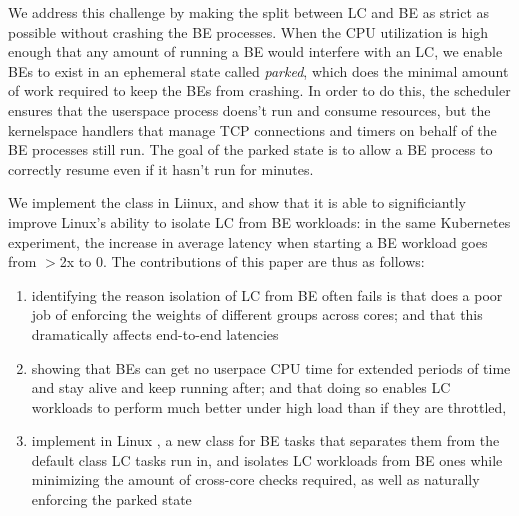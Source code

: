 We address this challenge by making the split between LC and BE as strict as
possible without crashing the BE processes. When the CPU utilization is high
enough that any amount of running a BE would interfere with an LC, we enable BEs
to exist in an ephemeral state called \textit{parked}, which does the minimal
amount of work required to keep the BEs from crashing. In order to do this, the
scheduler ensures that the userspace process doens't run and consume resources,
but the kernelspace handlers that manage TCP connections and timers on behalf of
the BE processes still run. The goal of the parked state is to allow a BE
process to correctly resume even if it hasn't run for minutes.

We implement the \beclass{} class in Liinux, and show that it is able to
significiantly improve Linux's ability to isolate LC from BE workloads: in the
same Kubernetes experiment, the increase in average latency when starting a BE
workload goes from $>$2x to 0. The contributions of this paper are thus as
follows: 
\begin{enumerate}
    \item identifying the reason isolation of LC from BE often fails is that
    \cgroups{} does a poor job of enforcing the weights of different groups
    across cores; and that this dramatically affects end-to-end latencies
    \item showing that BEs can get no userpace CPU time for extended periods of
    time and stay alive and keep running after; and that doing so enables LC
    workloads to perform much better under high load than if they are throttled,
    \item implement in Linux \beclass{}, a new class for BE tasks that separates
    them from the default class LC tasks run in, and isolates LC workloads from
    BE ones while minimizing the amount of cross-core checks required, as well as
    naturally enforcing the parked state
\end{enumerate}
